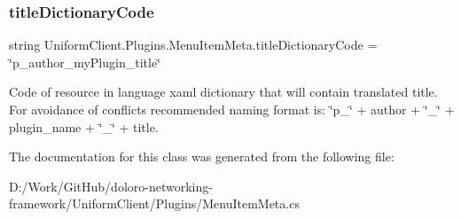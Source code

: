 \subsubsection{\texorpdfstring{title\+Dictionary\+Code}{titleDictionaryCode}}
{\footnotesize\ttfamily string Uniform\+Client.\+Plugins.\+Menu\+Item\+Meta.\+title\+Dictionary\+Code = \char`\"{}p\+\_\+author\+\_\+my\+Plugin\+\_\+title\char`\"{}}



Code of resource in language xaml dictionary that will contain translated title. For avoidance of conflicts recommended naming format is\+: \char`\"{}p\+\_\+\char`\"{} + author + \char`\"{}\+\_\+\char`\"{} + plugin\+\_\+name + \char`\"{}\+\_\+\char`\"{} + title. 



The documentation for this class was generated from the following file\+:\begin{DoxyCompactItemize}
\item 
D\+:/\+Work/\+Git\+Hub/doloro-\/networking-\/framework/\+Uniform\+Client/\+Plugins/Menu\+Item\+Meta.\+cs\end{DoxyCompactItemize}
